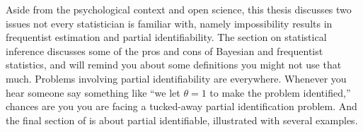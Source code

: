 Aside from the psychological context and open science, this thesis discusses two issues not every statistician is familiar with, namely impossibility results in frequentist estimation and partial identifiability. The section on statistical inference discusses some of the pros and cons of Bayesian and frequentist statistics, and will remind you about some definitions you might not use that much. Problems involving partial identifiability are everywhere. Whenever you hear someone say something like ``we let $\theta=1$ to make the problem identified,'' chances are you you are facing a tucked-away partial identification problem. And the final section of is about partial identifiable, illustrated with several examples. 